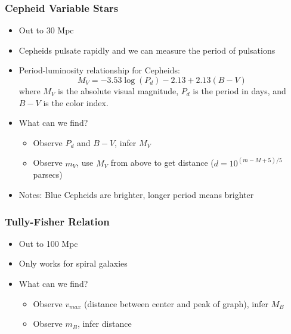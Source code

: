 \documentclass{book}
\begin{document}
\subsubsection{Cepheid Variable Stars}
\begin{itemize}
    \item Out to 30 Mpc
    \item Cepheids pulsate rapidly and we can measure the period of pulsations
    \item Period-luminosity relationship for Cepheids: $$M_V = -3.53 \log (P_d) - 2.13 + 2.13(B-V)$$ where $M_V$ is the absolute visual magnitude, $P_d$ is the period in days, and $B - V$ is the color index.
    \item What can we find?
          \begin{itemize}
              \item Observe $P_d$ and $B - V$, infer $M_V$
              \item Observe $m_V$, use $M_V$ from above to get distance ($d = 10^{(m - M + 5)/5}$ parsecs)
          \end{itemize}
    \item Notes: Blue Cepheids are brighter, longer period means brighter
\end{itemize}
\subsubsection{Tully-Fisher Relation}
\begin{itemize}
    \item Out to 100 Mpc
    \item Only works for spiral galaxies
    \item What can we find?
          \begin{itemize}
              \item Observe $v_{max}$ (distance between center and peak of graph), infer $M_B$
              \item Observe $m_B$, infer distance
          \end{itemize}
\end{itemize}
\end{document}
